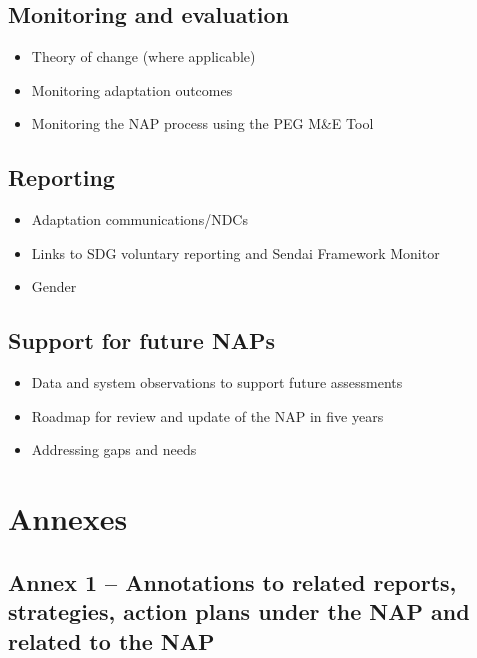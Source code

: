 \documentclass[
]{book}
\providecommand{\tightlist}{%
  \setlength{\itemsep}{0pt}\setlength{\parskip}{0pt}}
\begin{document}
\hypertarget{monitoring-and-evaluation}{%
\section{Monitoring and evaluation}\label{monitoring-and-evaluation}}

\begin{itemize}
\tightlist
\item
  Theory of change (where applicable)
\item
  Monitoring adaptation outcomes
\item
  Monitoring the NAP process using the PEG M\&E Tool
\end{itemize}

\hypertarget{reporting}{%
\section{Reporting}\label{reporting}}

\begin{itemize}
\tightlist
\item
  Adaptation communications/NDCs
\item
  Links to SDG voluntary reporting and Sendai Framework Monitor
\item
  Gender
\end{itemize}

\hypertarget{support-for-future-naps}{%
\section{Support for future NAPs}\label{support-for-future-naps}}

\begin{itemize}
\tightlist
\item
  Data and system observations to support future assessments
\item
  Roadmap for review and update of the NAP in five years
\item
  Addressing gaps and needs
\end{itemize}

\hypertarget{annexes}{%
\chapter{Annexes}\label{annexes}}

\hypertarget{annex-1-annotations-to-related-reports-strategies-action-plans-under-the-nap-and-related-to-the-nap}{%
\section{Annex 1 -- Annotations to related reports, strategies, action plans under the NAP and related to the NAP}\label{annex-1-annotations-to-related-reports-strategies-action-plans-under-the-nap-and-related-to-the-nap}}
\end{document}

